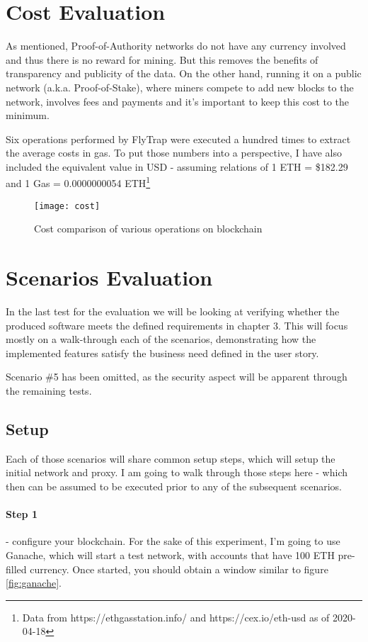 \section{Cost Evaluation}
As mentioned, Proof-of-Authority networks do not have any currency involved and thus there is no reward for mining. But this removes the benefits of transparency and publicity of the data. On the other hand, running it on a public network (a.k.a. Proof-of-Stake), where miners compete to add new blocks to the network, involves fees and payments and it's important to keep this cost to the minimum.

Six operations performed by FlyTrap were executed a hundred times to extract the average costs in gas. To put those numbers into a perspective, I have also included the equivalent value in USD - assuming relations of 1 ETH = \$182.29 and 1 Gas = 0.0000000054 ETH\footnote{Data from https://ethgasstation.info/ and https://cex.io/eth-usd as of 2020-04-18}

\begin{figure}[h]
    \centering
    \texttt{[image: cost]}
    \caption{Cost comparison of various operations on blockchain}
    \label{fig:cost}
\end{figure}

\section{Scenarios Evaluation}
In the last test for the evaluation we will be looking at verifying whether the produced software meets the defined requirements in chapter 3. This will focus mostly on a walk-through each of the scenarios, demonstrating how the implemented features satisfy the business need defined in the user story.

Scenario \#5 has been omitted, as the security aspect will be apparent through the remaining tests.
\subsection{Setup}
Each of those scenarios will share common setup steps, which will setup the initial network and proxy. I am going to walk through those steps here - which then can be assumed to be executed prior to any of the subsequent scenarios.
\paragraph{Step 1} - configure your blockchain. For the sake of this experiment, I'm going to use Ganache, which will start a test network, with accounts that have 100 ETH pre-filled currency. Once started, you should obtain a window similar to figure \ref{fig:ganache}.

